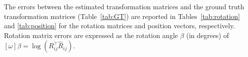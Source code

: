 \documentclass[letterpaper, 10 pt, journal, twoside]{IEEEtran}
\begin{document}
The errors between the estimated transformation matrices and the ground truth transformation matrices (Table~\ref{tab:GT}) are reported in Tables~\ref{tab:rotation} and \ref{tab:position} for the rotation matrices and position vectors, respectively. Rotation matrix errors are expressed as the rotation angle $\beta$ (in degrees) of $[\omega]\beta = \log(R_{ij}^\intercal \hat{R}_{ij})$.



\begin{table}%
    \vspace{3pt}
    \centering
    \renewcommand{\arraystretch}{1.5}
    \caption{Experimental results for relative grasp frame rotation matrix estimation. Results are represented in absolute degrees of rotation around the axis that rotates the estimated rotation matrix to the actual rotation matrix.}
    \label{tab:rotation}
\end{table}
\end{document}
